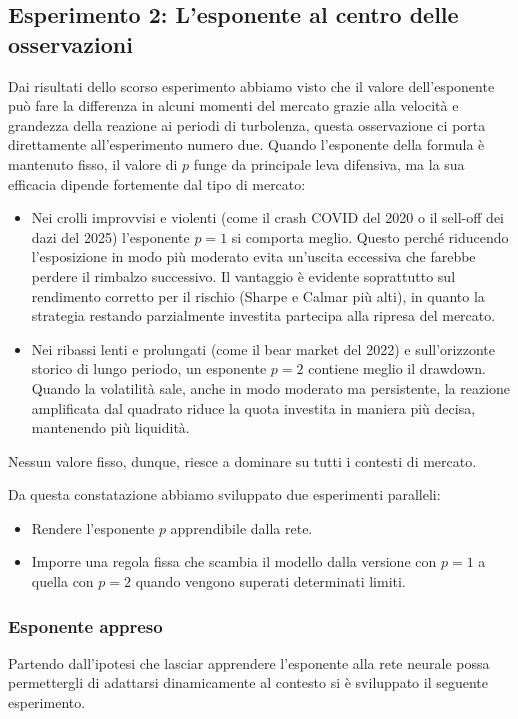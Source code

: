 \subsection{Esperimento 2: L'esponente al centro delle osservazioni}

Dai risultati dello scorso esperimento abbiamo visto che il valore dell'esponente può fare la differenza in alcuni momenti del mercato grazie alla velocità e grandezza della reazione ai periodi di turbolenza, questa osservazione ci porta direttamente all'esperimento numero due.
Quando l'esponente della formula è mantenuto fisso, il valore di $p$ funge da principale leva difensiva, ma la sua efficacia dipende fortemente dal tipo di mercato:
\begin{itemize}
\item Nei crolli improvvisi e violenti (come il crash COVID del 2020 o il sell-off dei dazi del 2025) l'esponente $p=1$ si comporta meglio. 
Questo perché riducendo l'esposizione in modo più moderato evita un'uscita eccessiva che farebbe perdere il rimbalzo successivo. 
Il vantaggio è evidente soprattutto sul rendimento corretto per il rischio (Sharpe e Calmar più alti), in quanto la strategia restando parzialmente investita partecipa alla ripresa del mercato.
\item Nei ribassi lenti e prolungati (come il bear market del 2022) e sull'orizzonte storico di lungo periodo, un esponente $p=2$ contiene meglio il drawdown. 
Quando la volatilità sale, anche in modo moderato ma persistente, la reazione amplificata dal quadrato riduce la quota investita in maniera più decisa, mantenendo più liquidità.
\end{itemize}
Nessun valore fisso, dunque, riesce a dominare su tutti i contesti di mercato.


Da questa constatazione abbiamo sviluppato due esperimenti paralleli:
\begin{itemize}
    \item Rendere l'esponente $p$ apprendibile dalla rete.
    \item Imporre una regola fissa che scambia il modello dalla versione con $p=1$ a quella con $p=2$ quando vengono superati determinati limiti.
\end{itemize}

\subsubsection{Esponente appreso}
Partendo dall'ipotesi che lasciar apprendere l'esponente alla rete neurale possa permettergli di adattarsi dinamicamente al contesto si è sviluppato il seguente esperimento.

